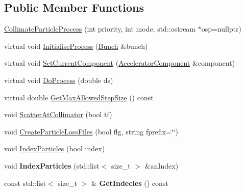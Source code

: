\subsection*{Public Member Functions}
\begin{DoxyCompactItemize}
\item 
\hyperlink{classParticleTracking_1_1CollimateParticleProcess_ae93c881a9b08429d74a06627c55d4cd4}{Collimate\+Particle\+Process} (int priority, int mode, std\+::ostream $\ast$osp=nullptr)
\item 
virtual void \hyperlink{classParticleTracking_1_1CollimateParticleProcess_a884a7d80cda58ee50cdaa4ec2fb56b62}{Initialise\+Process} (\hyperlink{classBunch}{Bunch} \&bunch)
\item 
virtual void \hyperlink{classParticleTracking_1_1CollimateParticleProcess_ab3f22a0f67414d883f33e39dab7d763b}{Set\+Current\+Component} (\hyperlink{classAcceleratorComponent}{Accelerator\+Component} \&component)
\item 
virtual void \hyperlink{classParticleTracking_1_1CollimateParticleProcess_a0e987f9ad599b59c82751cceff1b97f9}{Do\+Process} (double ds)
\item 
virtual double \hyperlink{classParticleTracking_1_1CollimateParticleProcess_a26262dec26f0c35658a2a968a1583b81}{Get\+Max\+Allowed\+Step\+Size} () const
\item 
void \hyperlink{classParticleTracking_1_1CollimateParticleProcess_a6ce4a520f7eb912bdfa635ef26614733}{Scatter\+At\+Collimator} (bool tf)
\item 
void \hyperlink{classParticleTracking_1_1CollimateParticleProcess_a621e89e37cda11077f18dc3ff4980de8}{Create\+Particle\+Loss\+Files} (bool flg, string fprefix=\char`\"{}\char`\"{})
\item 
void \hyperlink{classParticleTracking_1_1CollimateParticleProcess_ab6d43f1bec63763099ef71a003ceaef4}{Index\+Particles} (bool index)
\item 
\mbox{\label{classParticleTracking_1_1CollimateParticleProcess_ad048cb54a8e9e365e6102e0b4029aba0}} 
void {\bfseries Index\+Particles} (std\+::list$<$ size\+\_\+t $>$ \&an\+Index)
\item 
\mbox{\label{classParticleTracking_1_1CollimateParticleProcess_a80f6d0e9bbd8afda5e94ddc0d8be4203}} 
const std\+::list$<$ size\+\_\+t $>$ \& {\bfseries Get\+Indecies} () const
\item 

\end{DoxyCompactItemize}
